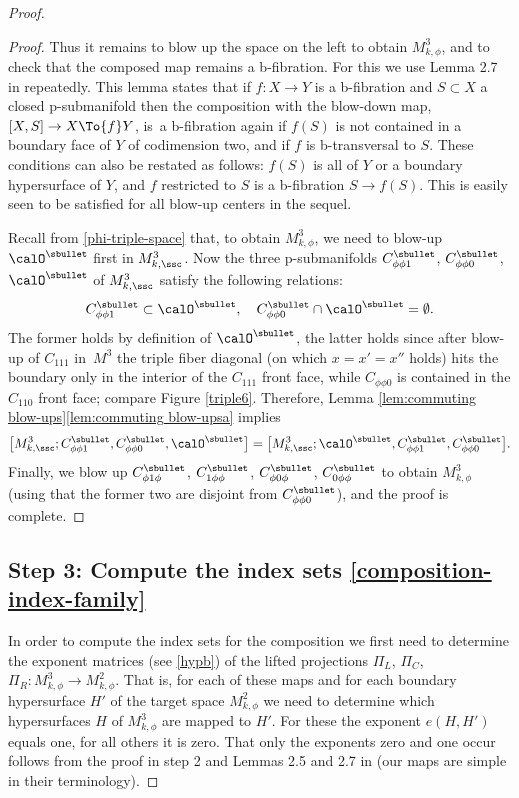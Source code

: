 \begin{proof}
\begin{proof}
Thus it remains to blow up the space on the left to obtain $M^3_{k,\phi}$, and to check that the composed map remains a b-fibration.
For this we use Lemma 2.7 in \cite{analytic-surgery} repeatedly. This lemma states that if $f:X\to Y$ is a b-fibration and $S\subset X$ a closed p-submanifold then the composition with the blow-down map, $[X,S]\to X\To{f} Y$, is~a b-fibration again if $f(S)$ is not contained in a boundary face of $Y$ of codimension two, and if $f$ is b-transversal to $S$. These conditions can also be restated as follows: $f(S)$ is all of $Y$ or a boundary hypersurface of $Y$, and $f$ restricted to $S$ is a b-fibration $S\to f(S)$. This is easily seen to be satisfied for all blow-up centers in the sequel.

Recall from \eqref{phi-triple-space} that, to obtain $M^3_{k,\phi}$, we need to blow-up $\calO^\sbullet$ first in $M^3_{k,\ssc}$. Now the three p-submanifolds $C_{\phi\phi1}^\sbullet$, $C_{\phi\phi0}^\sbullet$, $\calO^\sbullet$ of $M^3_{k,\ssc}$ satisfy the following relations:
\[
C_{\phi\phi1}^\sbullet \subset \calO^\sbullet,\quad C_{\phi\phi0}^\sbullet \cap \calO^\sbullet = \emptyset.
\]
The former holds by definition of $\calO^\sbullet$, the latter holds since after
blow-up of $C_{111}$ in~$M^3$ the triple fiber diagonal (on which $x=x'=x''$ holds) hits the boundary only in the interior of the $C_{111}$ front face, while $C_{\phi\phi0}$ is contained in the $C_{110}$ front face;
compare Figure
\ref{triple6}.
Therefore,
Lemma \ref{lem:commuting blow-ups}\eqref{lem:commuting blow-upsa} implies
\[
\bigl[M^{3}_{k,\ssc}; C_{\phi\phi1}^\sbullet,
C_{\phi\phi0}^\sbullet,\calO^\sbullet\bigr] = \bigl[M^{3}_{k,\ssc}; \calO^\sbullet, C_{\phi\phi1}^\sbullet,
C_{\phi\phi0}^\sbullet\bigr].
\]
Finally, we blow up $C_{\phi1\phi}^\sbullet$, $C_{1\phi\phi}^\sbullet$, $C_{\phi0\phi}^\sbullet$, $C_{0\phi\phi}^\sbullet$ to obtain $M^3_{k,\phi}$ (using that the former two are disjoint from $C_{\phi\phi0}^\sbullet$), and the proof is complete.
\end{proof}

\subsection*{Step 3: Compute the index sets \eqref{composition-index-family}}
In order to compute the index sets for the composition we first need to determine the exponent matrices (see \eqref{hypb}) of the lifted projections $\Pi_L$, $\Pi_C$, $\Pi_R: M^3_{k,\phi}\to M^2_{k,\phi}$. That is, for each of these maps and for each boundary hypersurface $H'$ of the target space $M^2_{k,\phi}$ we need to determine which hypersurfaces $H$ of $M^3_{k,\phi}$ are mapped to $H'$. For these the exponent $e(H,H')$ equals one, for all others it is zero. That only the exponents zero and one occur follows from the proof in step 2 and Lemmas 2.5 and 2.7 in \cite{analytic-surgery} (our maps are simple in their terminology).


\end{proof}
